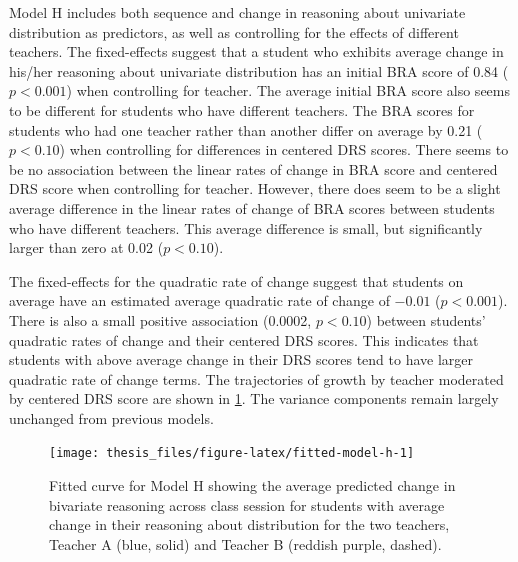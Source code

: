 \documentclass[11pt]{umnthesis}
\begin{document}
Model H includes both sequence and change in reasoning about univariate distribution as predictors, as well as controlling for the effects of different teachers. The fixed-effects suggest that a student who exhibits average change in his/her reasoning about univariate distribution has an initial BRA score of 0.84 (\(p<0.001\)) when controlling for teacher. The average initial BRA score also seems to be different for students who have different teachers. The BRA scores for students who had one teacher rather than another differ on average by 0.21 (\(p<0.10\)) when controlling for differences in centered DRS scores. There seems to be no association between the linear rates of change in BRA score and centered DRS score when controlling for teacher. However, there does seem to be a slight average difference in the linear rates of change of BRA scores between students who have different teachers. This average difference is small, but significantly larger than zero at 0.02 (\(p<0.10\)).

The fixed-effects for the quadratic rate of change suggest that students on average have an estimated average quadratic rate of change of \(-0.01\) (\(p<0.001\)). There is also a small positive association (0.0002, \(p<0.10\)) between students' quadratic rates of change and their centered DRS scores. This indicates that students with above average change in their DRS scores tend to have larger quadratic rate of change terms. The trajectories of growth by teacher moderated by centered DRS score are shown in \ref{fig:fitted-model-h}. The variance components remain largely unchanged from previous models.

\begin{figure}[H]

{\centering \texttt{[image: thesis\_files/figure-latex/fitted-model-h-1]} 

}

\caption[Fitted curve for Model H showing the average predicted change in bivariate reasoning across class session for students with  average change in their reasoning about distribution for the two teachers, Teacher A (blue, solid) and Teacher B (reddish purple, dashed)]{Fitted curve for Model H showing the average predicted change in bivariate reasoning across class session for students with  average change in their reasoning about distribution for the two teachers, Teacher A (blue, solid) and Teacher B (reddish purple, dashed).}\label{fig:fitted-model-h}
\end{figure}
\end{document}
